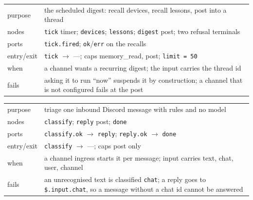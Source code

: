\begin{center}\footnotesize
\begin{tabular}{@{}>{\raggedright\arraybackslash}p{}>{\raggedright\arraybackslash}p{}@{}}
  purpose & the scheduled digest: recall devices, recall lessons, post into a thread \\
  nodes & \texttt{tick} timer; \texttt{devices}; \texttt{lessons}; \texttt{digest} post; two
    refusal terminals \\
  ports & \texttt{tick.fired}; \texttt{ok}/\texttt{err} on the recalls \\
  entry/exit & \texttt{tick} $\to$ ---; caps memory\_read, post; \texttt{limit = 50} \\
  when & a channel wants a recurring digest; the input carries the thread id \\
  fails & asking it to run \enquote{now} suspends it by construction; a channel that is not
    configured fails at the post \\
\end{tabular}
\end{center}

\begin{center}\footnotesize
\begin{tabular}{@{}>{\raggedright\arraybackslash}p{}>{\raggedright\arraybackslash}p{}@{}}
  purpose & triage one inbound Discord message with rules and no model \\
  nodes & \texttt{classify}; \texttt{reply} post; \texttt{done} \\
  ports & \texttt{classify.ok} $\to$ \texttt{reply}; \texttt{reply.ok} $\to$ \texttt{done} \\
  entry/exit & \texttt{classify} $\to$ ---; caps post only \\
  when & a channel ingress starts it per message; input carries text, chat, user, channel \\
  fails & an unrecognised text is classified \texttt{chat}; a reply goes to
    \texttt{\$.input.chat}, so a message without a chat id cannot be answered \\
\end{tabular}
\end{center}

